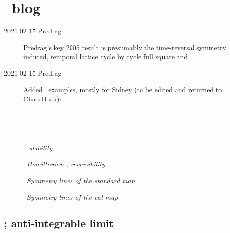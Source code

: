 


\section{\Henon\ blog}
\label{sect:HenonBlog}

\begin{description}

    \item[2021-02-17 Predrag]
Predrag's  key 2005 result is presumably the time-reversal symmetry
induced, temporal lattice cycle by cycle full square
 and .

    \item[2021-02-15 Predrag]
Added \HenonMap\ examples, mostly for Sidney
(to be edited and returned to ChaosBook):

~{\em {\HenonMap}}


~{\em {\Henlatt}}

~{\em {\Henlatt} stability}

~{\em Hamiltonian {\HenonMap}, reversibility}

~{\em Symmetry lines of the standard map}

~{\em Symmetry lines of the cat map}


\end{description}

\subsection{{\Henlatt}; anti-integrable limit}
\label{sect:HamHenonMap}

